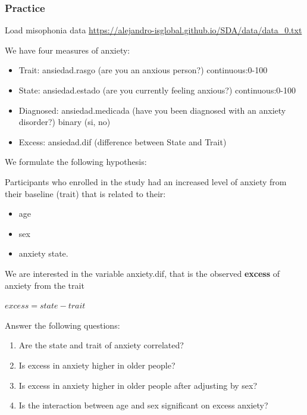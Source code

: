 \documentclass[
]{book}
\providecommand{\tightlist}{%
  \setlength{\itemsep}{0pt}\setlength{\parskip}{0pt}}
\begin{document}
\hypertarget{practice-9}{%
\subsubsection{Practice}\label{practice-9}}

Load misophonia data \url{https://alejandro-isglobal.github.io/SDA/data/data_0.txt}

We have four measures of anxiety:

\begin{itemize}
\tightlist
\item
  Trait: ansiedad.rasgo (are you an anxious person?) continuous:0-100
\item
  State: ansiedad.estado (are you currently feeling anxious?) continuous:0-100
\item
  Diagnosed: ansiedad.medicada (have you been diagnosed with an anxiety disorder?) binary (si, no)
\item
  Excess: ansiedad.dif (difference between State and Trait)
\end{itemize}

We formulate the following hypothesis:

Participants who enrolled in the study had an increased level of anxiety from their baseline (trait) that is related to their:

\begin{itemize}
\tightlist
\item
  age
\item
  sex
\item
  anxiety state.
\end{itemize}

We are interested in the variable anxiety.dif, that is the observed \textbf{excess} of anxiety from the trait

\(excess = state - trait\)

Answer the following questions:

\begin{enumerate}
\def\labelenumi{\arabic{enumi}.}
\item
  Are the state and trait of anxiety correlated?
\item
  Is excess in anxiety higher in older people?
\item
  Is excess in anxiety higher in older people after adjusting by sex?
\item
  Is the interaction between age and sex significant on excess anxiety?
\end{enumerate}
\end{document}

